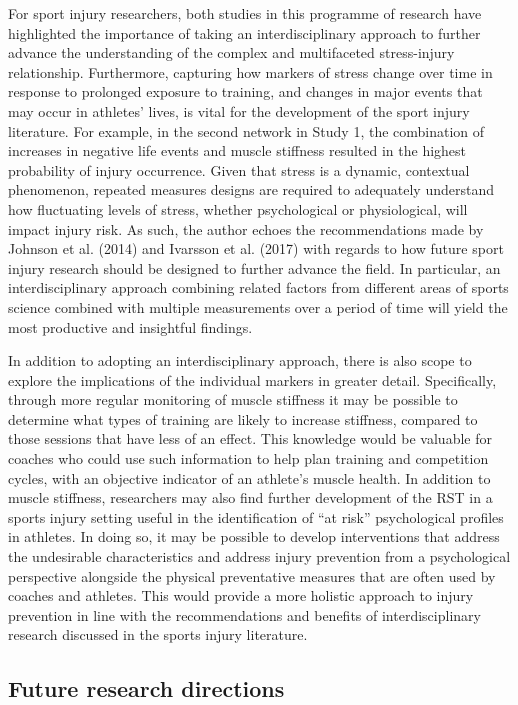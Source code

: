 \documentclass[
  english,
  man,floatsintext]{apa6}
\begin{document}
For sport injury researchers, both studies in this programme of research have highlighted the importance of taking an interdisciplinary approach to further advance the understanding of the complex and multifaceted stress-injury relationship.
Furthermore, capturing how markers of stress change over time in response to prolonged exposure to training, and changes in major events that may occur in athletes' lives, is vital for the development of the sport injury literature.
For example, in the second network in Study 1, the combination of increases in negative life events and muscle stiffness resulted in the highest probability of injury occurrence.
Given that stress is a dynamic, contextual phenomenon, repeated measures designs are required to adequately understand how fluctuating levels of stress, whether psychological or physiological, will impact injury risk.
As such, the author echoes the recommendations made by Johnson et al. (2014) and Ivarsson et al. (2017) with regards to how future sport injury research should be designed to further advance the field.
In particular, an interdisciplinary approach combining related factors from different areas of sports science combined with multiple measurements over a period of time will yield the most productive and insightful findings.

In addition to adopting an interdisciplinary approach, there is also scope to explore the implications of the individual markers in greater detail.
Specifically, through more regular monitoring of muscle stiffness it may be possible to determine what types of training are likely to increase stiffness, compared to those sessions that have less of an effect.
This knowledge would be valuable for coaches who could use such information to help plan training and competition cycles, with an objective indicator of an athlete's muscle health.
In addition to muscle stiffness, researchers may also find further development of the RST in a sports injury setting useful in the identification of \enquote{at risk} psychological profiles in athletes.
In doing so, it may be possible to develop interventions that address the undesirable characteristics and address injury prevention from a psychological perspective alongside the physical preventative measures that are often used by coaches and athletes.
This would provide a more holistic approach to injury prevention in line with the recommendations and benefits of interdisciplinary research discussed in the sports injury literature.

\hypertarget{future-research-directions}{%
\subsection{Future research directions}\label{future-research-directions}}
\end{document}
